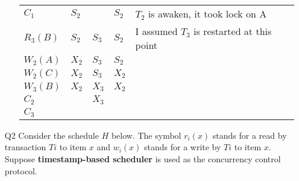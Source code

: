 \documentclass{article}
\begin{document}
\begin{enumerate}
\begin{enumerate}
\begin{center}
\begin{longtable}{|p{2cm}|p{1.5cm}|p{1.5cm}|p{1.5cm}|p{6.5cm}|}
                \hline 
                \multirow{2}{*}{$C_1$} & \multirow{2}{*}{$S_2$} & \multirow{2}{*}{} & \multirow{2}{*}{$S_2$} & \multirow{2}{*}{$T_2$ is awaken, it took lock on A} \\
                 & & & & \\
                \hline 
                \multirow{2}{*}{$R_3(B)$} & \multirow{2}{*}{$S_2$} & \multirow{2}{*}{$S_3$} & \multirow{2}{*}{$S_2$} & \multirow{2}{*}{I assumed $T_3$ is restarted at this point} \\
                 & & & & \\
                \hline 
                \multirow{2}{*}{$W_2(A)$} & \multirow{2}{*}{$X_2$} & \multirow{2}{*}{$S_3$} & \multirow{2}{*}{$S_2$} & \multirow{2}{*}{} \\
                 & & & & \\
                \hline 
                \multirow{2}{*}{$W_2(C)$} & \multirow{2}{*}{$X_2$} & \multirow{2}{*}{$S_3$} & \multirow{2}{*}{$X_2$} & \multirow{2}{*}{} \\
                 & & & & \\
                \hline 
                \multirow{2}{*}{$W_3(B)$} & \multirow{2}{*}{$X_2$} & \multirow{2}{*}{$X_3$} & \multirow{2}{*}{$X_2$} & \multirow{2}{*}{} \\
                 & & & & \\
                \hline 
                \multirow{2}{*}{$C_2$} & \multirow{2}{*}{} & \multirow{2}{*}{$X_3$} & \multirow{2}{*}{} & \multirow{2}{*}{} \\
                 & & & & \\
                \hline
                \multirow{2}{*}{$C_3$} & \multirow{2}{*}{} & \multirow{2}{*}{} & \multirow{2}{*}{} & \multirow{2}{*}{} \\
                 & & & & \\
                \hline
            \end{longtable}
        \end{center}
        
    \end{enumerate}
    
    \newpage
    
    \item [Q2] Consider the schedule $ H $ below. The symbol $ r_i(x) $ stands for a read by transaction $ Ti $ to item $ x $ and $ w_i(x) $ stands for a write by $ Ti $ to item $ x $. Suppose \textbf{timestamp-based scheduler} is used as the concurrency control protocol.
    

\end{enumerate}
\end{document}
